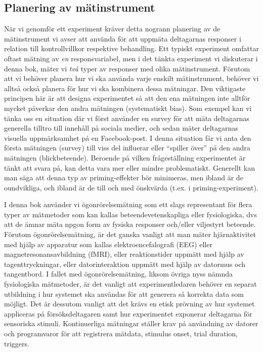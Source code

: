 \documentclass[
]{book}
\begin{document}
\hypertarget{sub07.3.5}{%
\subsection{Planering av mätinstrument}\label{sub07.3.5}}

När vi genomför ett experiment kräver detta nogrann planering av de mätinstrument vi avser att använda för att uppmäta deltagarnas responser i relation till kontrollvillkor respektive behandling. Ett typiskt experiment omfattar oftast mätning av \emph{en} responsvariabel, men i det tänkta experiment vi diskuterar i denna bok, mäter vi \emph{två} typer av responser med olika mätinstrument. Förutom att vi behöver planera hur vi ska använda varje enskilt mätinstrument, behöver vi alltså också planera för hur vi ska kombinera dessa mätningar. Den viktigaste principen här är att designa experimentet så att den ena mätningen inte alltför mycket påverkar den andra mätningen (systematiskt bias). Som exempel kan vi tänka oss en situation där vi först använder en survey för att mäta deltagarnas generella tilltro till innehåll på sociala medier, och sedan mäter deltagarnas visuella uppmärksamhet på en Facebook-post. I denna situation får vi anta den första mätningen (survey) till viss del influerar eller ``spiller över'' på den andra mätningen (blickbeteende). Beroende på vilken frågeställning experimentet är tänkt att svara på, kan detta vara mer eller mindre problematiskt. Generellt kan man säga att denna typ av priming-effekter bör minimeras, men ibland är de oundvikliga, och ibland är de till och med önskvärda (t.ex. i priming-experiment).

I denna bok använder vi ögonrörelsemätning som ett slags representant för flera typer av mätmetoder som kan kallas beteendevetenskapliga eller fysiologiska, dvs att de ämnar mäta npgon form av fysiska responser och/eller viljestyrt beteende. Förutom ögonrörelsemätning, är det ganska vanligt att man mäter hjärnaktivitet med hjälp av apparatur som kallas elektroencefalografi (EEG) eller magnetresonansavbildning (fMRI), eller reaktionstider uppmätt med hjälp av tagenttryckningar, eller datorinteraktion uppmätt med hjälp av datormus och tangentbord. I fallet med ögonrörelsemätning, liksom övriga nyss nämnda fysiologiska mätmetoder, är det vanligt att experimentledaren behöver en separat utbildning i hur systemet ska användas för att generera så korrekta data som möjligt. Det är dessutom vanligt att det krävs en etisk prövning av hur systemet appliceras på försöksdeltagaren samt hur experimentet exponerar deltagarna för sensoriska stimuli. Kontinuerliga mätningar ställer krav på användning av datorer och programvaror för att registrera mätdata, stimulus onset, trial duration, triggers.
\end{document}
